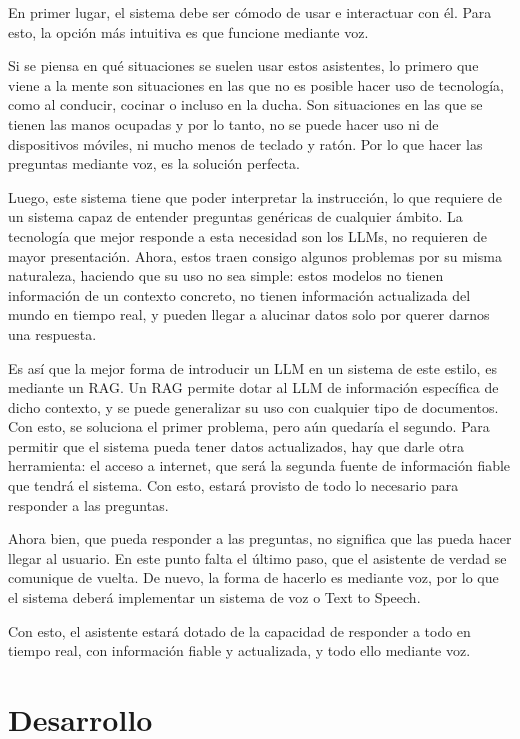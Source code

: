 \documentclass[11pt,spanish,listoffigures,listoftables]{tfgetsinf}
\begin{document}
En primer lugar, el sistema debe ser cómodo de usar e interactuar con él. Para esto, la opción más intuitiva es que funcione mediante voz. 

Si se piensa en qué situaciones se suelen usar estos asistentes, lo primero que viene a la mente son situaciones en las que no es posible hacer uso de tecnología, como al conducir, cocinar o incluso en la ducha. Son situaciones en las que se tienen las manos ocupadas y por lo tanto, no se puede hacer uso ni de dispositivos móviles, ni mucho menos de teclado y ratón. Por lo que hacer las preguntas mediante voz, es la solución perfecta.

Luego, este sistema tiene que poder interpretar la instrucción, lo que requiere de un sistema capaz de entender preguntas genéricas de cualquier ámbito. La tecnología que mejor responde a esta necesidad son los LLMs, no requieren de mayor presentación. Ahora, estos traen consigo algunos problemas por su misma naturaleza, haciendo que su uso no sea simple: estos modelos no tienen información de un contexto concreto, no tienen información actualizada del mundo en tiempo real, y pueden llegar a alucinar datos solo por querer darnos una respuesta.

Es así que la mejor forma de introducir un LLM en un sistema de este estilo, es mediante un RAG. Un RAG permite dotar al LLM de información específica de dicho contexto, y se puede generalizar su uso con cualquier tipo de documentos. Con esto, se soluciona el primer problema, pero aún quedaría el segundo. Para permitir que el sistema pueda tener datos actualizados, hay que darle otra herramienta: el acceso a internet, que será la segunda fuente de información fiable que tendrá el sistema. Con esto, estará provisto de todo lo necesario para responder a las preguntas.

Ahora bien, que pueda responder a las preguntas, no significa que las pueda hacer llegar al usuario. En este punto falta el último paso, que el asistente de verdad se comunique de vuelta. De nuevo, la forma de hacerlo es mediante voz, por lo que el sistema deberá implementar un sistema de voz o Text to Speech.

Con esto, el asistente estará dotado de la capacidad de responder a todo en tiempo real, con información fiable y actualizada, y todo ello mediante voz.


\chapter{Desarrollo}
\end{document}
